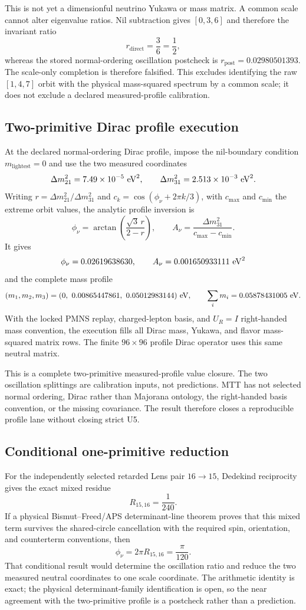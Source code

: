 \documentclass[11pt]{article}
\begin{document}
This is not yet a dimensionful neutrino Yukawa or mass matrix. A common scale
cannot alter eigenvalue ratios. Nil subtraction gives $[0,3,6]$ and therefore
the invariant ratio
\[
r_{\mathrm{direct}}=\frac{3}{6}=\frac12,
\]
whereas the stored normal-ordering oscillation postcheck is
$r_{\mathrm{post}}=0.02980501393$. The scale-only completion is therefore
falsified. This excludes identifying the raw $[1,4,7]$ orbit with the physical
mass-squared spectrum by a common scale; it does not exclude a declared
measured-profile calibration.

\subsection{Two-primitive Dirac profile execution}

At the declared normal-ordering Dirac profile, impose the nil-boundary
condition $m_{\mathrm{lightest}}=0$ and use the two measured coordinates
\[
\Delta m_{21}^2=7.49\times10^{-5}\ {\rm eV}^2,
\qquad
\Delta m_{31}^2=2.513\times10^{-3}\ {\rm eV}^2.
\]
Writing $r=\Delta m_{21}^2/\Delta m_{31}^2$ and
$c_k=\cos(\phi_\nu+2\pi k/3)$, with $c_{\max}$ and $c_{\min}$ the extreme
orbit values, the analytic profile inversion is
\[
\phi_\nu=\arctan\!\left(\frac{\sqrt3\,r}{2-r}\right),
\qquad
A_\nu=\frac{\Delta m_{31}^2}{c_{\max}-c_{\min}}.
\]
It gives
\[
\phi_\nu=0.02619638630,\qquad
A_\nu=0.001650933111\ {\rm eV}^2
\]
and the complete mass profile
\[
(m_1,m_2,m_3)
=(0,\ 0.00865447861,\ 0.05012983144)\ {\rm eV},
\qquad
\sum_i m_i=0.05878431005\ {\rm eV}.
\]
With the locked PMNS replay, charged-lepton basis, and $U_R=I$ right-handed
mass convention, the execution fills all Dirac mass, Yukawa, and flavor
mass-squared matrix rows. The finite $96\times96$ profile Dirac operator uses
this same neutral matrix.

This is a complete two-primitive measured-profile value closure. The two
oscillation splittings are calibration inputs, not predictions. MTT has not
selected normal ordering, Dirac rather than Majorana ontology, the
right-handed basis convention, or the missing covariance. The result therefore
closes a reproducible profile lane without closing strict U5.

\subsection{Conditional one-primitive reduction}

For the independently selected retarded Lens pair $16\to15$, Dedekind
reciprocity gives the exact mixed residue
\[
R_{15,16}=\frac1{240}.
\]
If a physical Bismut--Freed/APS determinant-line theorem proves that this mixed
term survives the shared-circle cancellation with the required spin,
orientation, and counterterm conventions, then
\[
\phi_\nu=2\pi R_{15,16}=\frac{\pi}{120}.
\]
That conditional result would determine the oscillation ratio and reduce the
two measured neutral coordinates to one scale coordinate. The arithmetic
identity is exact; the physical determinant-family identification is open, so
the near agreement with the two-primitive profile is a postcheck rather than a
prediction.
\end{document}
